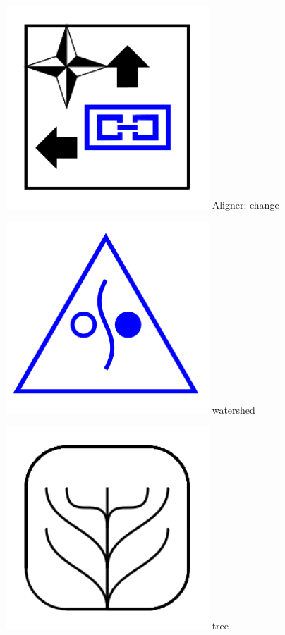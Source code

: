 \documentclass[11pt]{article}
\begin{document}
\includegraphics[width=3in]{image13.png}
Aligner: change

\includegraphics[width=3in]{image14.png}
watershed

\includegraphics[width=3in]{image15.png}
tree
\end{document}
